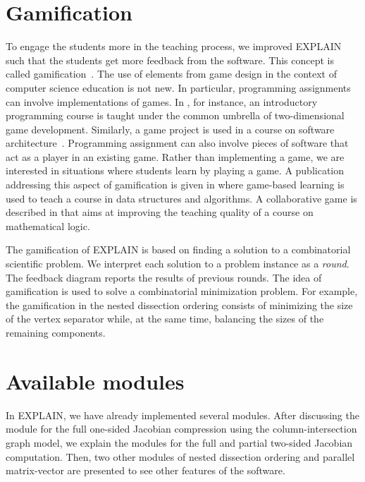 \documentclass[12pt, twoside,a4paper,toc=bibliography]{scrbook}
\begin{document}
\section{Gamification}
\label{s.game}
To engage the students more in the teaching process, we improved EXPLAIN such that the students get
more feedback from the software. 
This concept is called gamification~\cite{deterding2011:gug,deterding2011}.
The use of elements from game design in the context of
computer science education is not new. In particular, programming assignments can involve
implementations of games. In \cite{la2007:gfa}, for instance, an introductory programming course is
taught under the common umbrella of two-dimensional game development. Similarly, a game project is
used in a course on software architecture~\cite{Wang2011:EEU}. Programming assignment can also
involve pieces of software that act as a player in an existing game. Rather than implementing a game, we are
interested in situations where students learn by playing a game. 
A publication addressing this aspect of gamification is given in
\cite{Hakulinen2011:usg} where game-based learning is used to teach a course in data structures and
algorithms. A collaborative game is described in \cite{shl:bsc} that aims at improving the teaching
quality of a course on mathematical logic.

The gamification of \mbox{EXPLAIN} is based on finding a solution to a combinatorial scientific problem.
We interpret each solution to a problem instance as a \textit{round}.
The feedback diagram reports the results of previous rounds.
The idea of gamification is used to solve a combinatorial
minimization problem. For example, the gamification in the nested dissection ordering 
consists of minimizing the size of the vertex separator while, at the same
time, balancing the sizes of the remaining components.


\section{Available modules}
\label{s.av.modules}
In \mbox{EXPLAIN}, we have already implemented several modules.
After discussing the module for the full one-sided Jacobian compression using the column-intersection graph model,
we explain the modules for the full and partial two-sided Jacobian computation. 
Then, two other modules of nested dissection ordering and parallel matrix-vector
are presented to see other features of the software.
\end{document}

